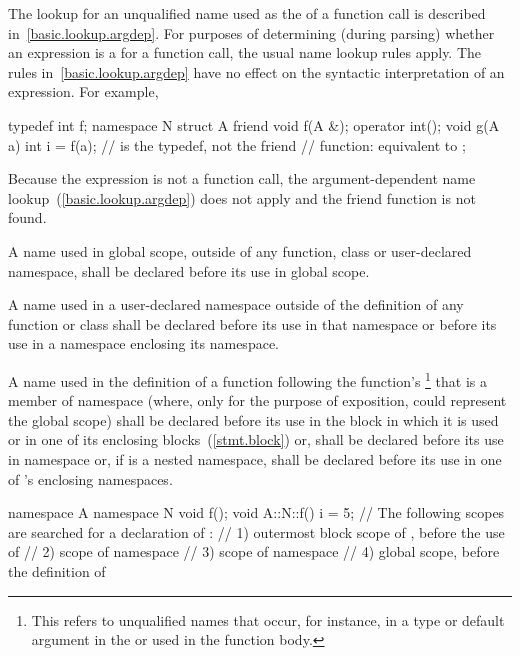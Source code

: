 \pnum
The lookup for an unqualified name used as the
 of a function call is described
in~\ref{basic.lookup.argdep}. \enternote For purposes of determining
(during parsing) whether an expression is a
 for a function call, the usual name lookup
rules apply. The rules in~\ref{basic.lookup.argdep} have no effect on
the syntactic interpretation of an expression. For example,

\begin{codeblock}
typedef int f;
namespace N {
  struct A {
    friend void f(A &);
    operator int();
    void g(A a) {
      int i = f(a);         //  is the typedef, not the friend
                            // function: equivalent to 
    }
  };
}
\end{codeblock}

Because the expression is not a function call, the argument-dependent
name lookup~(\ref{basic.lookup.argdep}) does not apply and the friend
function  is not found. \exitnote

\pnum
A name used in global scope, outside of any function, class or
user-declared namespace, shall be declared before its use in global
scope.

\pnum
A name used in a user-declared namespace outside of the definition of
any function or class shall be declared before its use in that namespace
or before its use in a namespace enclosing its namespace.

\pnum
A name used in the definition of a function following the function's
\footnote{This refers to unqualified names
that occur, for instance, in
a type or default argument in the
 or used in the function body.}
that is a member of namespace  (where, only for the purpose of
exposition,  could represent the global scope) shall be
declared before its use in the block in which it is used or in one of
its enclosing blocks~(\ref{stmt.block}) or, shall be declared before its
use in namespace  or, if  is a nested namespace, shall
be declared before its use in one of 's enclosing namespaces.
\enterexample

\begin{codeblock}
namespace A {
  namespace N {
    void f();
  }
}
void A::N::f() {
  i = 5;
  // The following scopes are searched for a declaration of :
  // 1) outermost block scope of , before the use of 
  // 2) scope of namespace 
  // 3) scope of namespace 
  // 4) global scope, before the definition of 
}
\end{codeblock}
\exitexample 


